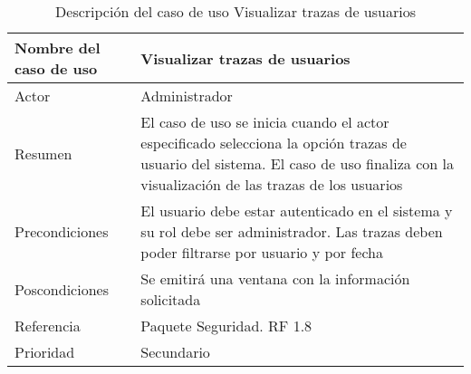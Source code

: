 \begin{table}[H]
	\sf
	\begin{supertabular}{|p{4.5cm}|p{12cm}|}
		\hline
		\textbf{Nombre del caso de uso}
		& \textbf{Visualizar trazas de usuarios} \\ \hline
		
		Actor
		& Administrador \\ \hline
		
		Resumen
		& El caso de uso se inicia cuando el actor especificado selecciona la opción trazas de usuario del sistema. El caso de uso finaliza con la visualización de las trazas de los usuarios \\ \hline
		
		Precondiciones
		& El usuario debe estar autenticado en el sistema y su rol debe ser administrador. Las trazas deben poder filtrarse por usuario y por fecha \\ \hline
		
		Poscondiciones
		& Se emitirá una ventana con la información solicitada \\ \hline
		
		Referencia
		& Paquete Seguridad. RF 1.8 \\ \hline
		
		Prioridad
		& Secundario \\		
		\hline
	\end{supertabular}
	\caption[Descripción del caso de uso Visualizar trazas de usuarios]{Descripción del caso de uso Visualizar trazas de usuarios}
	\label{table:CU_VisTrazaUs}
\end{table}

